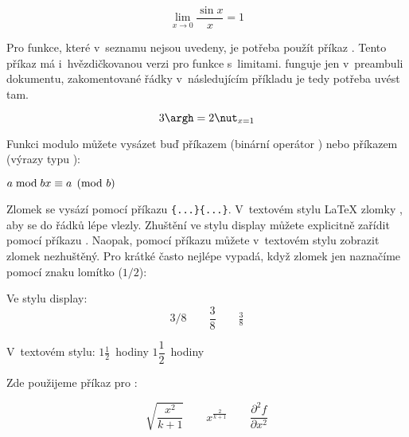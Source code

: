 \begin{example}
\begin{equation*}
  \lim_{x \rightarrow 0}
  \frac{\sin x}{x}=1
\end{equation*}
\end{example}

Pro funkce, které v~seznamu nejsou uvedeny, je potřeba použít příkaz
. Tento příkaz má i~hvězdičkovanou verzi pro
funkce s~limitami.  funguje jen v~preambuli
dokumentu, zakomentované řádky v~následujícím příkladu je tedy potřeba
uvést tam.

\begin{example}
\begin{equation*}
  3\argh = 2\nut_{x=1}    
\end{equation*}
\end{example}

Funkci modulo můžete vysázet buď příkazem  (binární
operátor ) nebo příkazem  (výrazy typu
):
\begin{example}
$a\bmod b \\
 x\equiv a \pmod{b}$
\end{example}

Zlomek se vysází pomocí příkazu \verb|{...}{...}|.
V~textovém stylu \LaTeX{} zlomky , aby se do řádků lépe vlezly.
Zhuštění ve stylu display můžete explicitně zařídit pomocí příkazu
. Naopak, pomocí příkazu  můžete v~textovém stylu
zobrazit zlomek nezhuštěný. Pro krátké  často nejlépe
vypadá, když zlomek jen naznačíme pomocí znaku lomítko ($1/2$):
\begin{example}
Ve stylu display:
\begin{equation*}
  3/8 \qquad \frac{3}{8} 
  \qquad \tfrac{3}{8}
\end{equation*}
\end{example}

\begin{example}
V~textovém stylu:
$1\frac{1}{2}$~hodiny \quad
$1\dfrac{1}{2}$~hodiny
\end{example}
 
Zde použijeme příkaz  pro :
\begin{example}
\begin{equation*} 
  \sqrt{\frac{x^2}{k+1}}\qquad
  x^\frac{2}{k+1}\qquad
  \frac{\partial^2f}
  {\partial x^2} 
\end{equation*}
\end{example}


